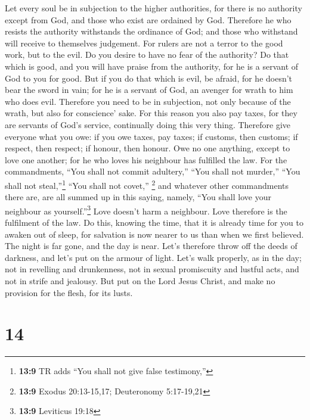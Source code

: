  Let every soul be in subjection to the higher
authorities, for there is no authority except from God, and those who
exist are ordained by God.  Therefore he who resists the
authority withstands the ordinance of God; and those who withstand will
receive to themselves judgement.  For rulers are not a
terror to the good work, but to the evil. Do you desire to have no fear
of the authority? Do that which is good, and you will have praise from
the authority,  for he is a servant of God to you for
good. But if you do that which is evil, be afraid, for he doesn't bear
the sword in vain; for he is a servant of God, an avenger for wrath to
him who does evil.  Therefore you need to be in
subjection, not only because of the wrath, but also for conscience'
sake.  For this reason you also pay taxes, for they are
servants of God's service, continually doing this very thing.
 Therefore give everyone what you owe: if you owe taxes,
pay taxes; if customs, then customs; if respect, then respect; if
honour, then honour.  Owe no one anything, except to love
one another; for he who loves his neighbour has fulfilled the law.
 For the commandments, ``You shall not commit adultery,''
``You shall not murder,'' ``You shall not steal,''\footnote{\textbf{13:9}
  TR adds ``You shall not give false testimony,''} ``You shall not
covet,'' \footnote{\textbf{13:9} Exodus 20:13-15,17; Deuteronomy
  5:17-19,21} and whatever other commandments there are, are all summed
up in this saying, namely, ``You shall love your neighbour as
yourself.''\footnote{\textbf{13:9} Leviticus 19:18}  Love
doesn't harm a neighbour. Love therefore is the fulfilment of the law.
 Do this, knowing the time, that it is already time for
you to awaken out of sleep, for salvation is now nearer to us than when
we first believed.  The night is far gone, and the day is
near. Let's therefore throw off the deeds of darkness, and let's put on
the armour of light.  Let's walk properly, as in the day;
not in revelling and drunkenness, not in sexual promiscuity and lustful
acts, and not in strife and jealousy.  But put on the
Lord Jesus Christ, and make no provision for the flesh, for its lusts.

\hypertarget{section-13}{%
\section{14}\label{section-13}}

